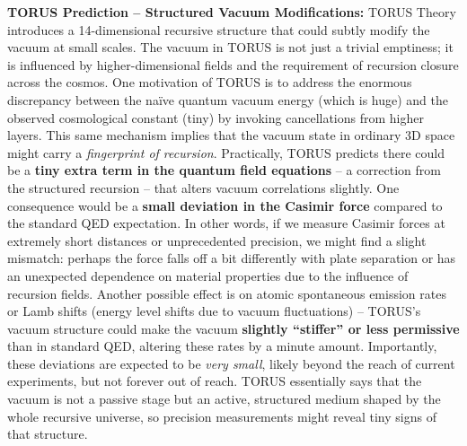 \documentclass[
]{article}
\begin{document}
{\textbf{TORUS Prediction -- Structured Vacuum Modifications:} TORUS
Theory introduces a 14-dimensional recursive structure that could subtly
modify the vacuum at small scales. The vacuum in TORUS is not just a
trivial emptiness; it is influenced by higher-dimensional fields and the
requirement of recursion closure across the cosmos. One motivation of
TORUS is to address the enormous discrepancy between the naïve quantum
vacuum energy (which is huge) and the observed cosmological constant
(tiny) by invoking cancellations from higher layers\hspace{0pt}. This
same mechanism implies that the vacuum state in ordinary 3D space might
carry a \emph{fingerprint of recursion}. Practically, TORUS predicts
there could be a \textbf{tiny extra term in the quantum field equations}
-- a correction from the structured recursion -- that alters vacuum
correlations slightly\hspace{0pt}. One consequence would be a
\textbf{small deviation in the Casimir force} compared to the standard
QED expectation\hspace{0pt}. In other words, if we measure Casimir
forces at extremely short distances or unprecedented precision, we might
find a slight mismatch: perhaps the force falls off a bit differently
with plate separation or has an unexpected dependence on material
properties due to the influence of recursion fields. Another possible
effect is on atomic spontaneous emission rates or Lamb shifts (energy
level shifts due to vacuum fluctuations) -- TORUS's vacuum structure
could make the vacuum \textbf{slightly ``stiffer'' or less permissive}
than in standard QED, altering these rates by a minute
amount\hspace{0pt}. Importantly, these deviations are expected to be
\emph{very small}, likely beyond the reach of current experiments, but
not forever out of reach\hspace{0pt}. TORUS essentially says that the
vacuum is not a passive stage but an active, structured medium shaped by
the whole recursive universe, so precision measurements might reveal
tiny signs of that structure.

}
\end{document}
